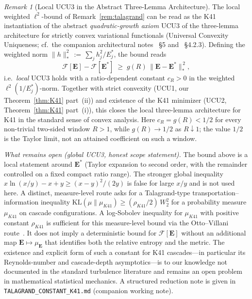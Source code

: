 \documentclass[12pt,a4paper]{article}
\theoremstyle{definition}
\theoremstyle{plain}
\theoremstyle{remark}
\newtheorem{remark}[definition]{Remark}
\begin{document}
\begin{remark}[Local UCU3 in the Abstract Three-Lemma Architecture]
\label{rem:local-ucu3}
The local weighted $\ell^2$-bound of Remark~\ref{rem:talagrand} can be read as
the K41 instantiation of the abstract \emph{quadratic-growth axiom}
\textnormal{UCU3} of the three-lemma architecture for strictly convex
variational functionals (Universal Convexity Uniqueness; cf.\ the
companion architectural notes ~\S5
and ~\S4.2.3).  Defining the
weighted norm $\|h\|^2_*\,:=\,\sum_j h_j^2/E_j^*$, the bound reads
\[
  \mathcal{F}[\mathbf{E}] - \mathcal{F}[\mathbf{E}^*]
  \;\ge\;
  g(R)\,\|\mathbf{E}-\mathbf{E}^*\|_*^{\,2},
\]
i.e.\ \emph{local} UCU3 holds with a ratio-dependent constant $c_R>0$ in
the weighted $\ell^2(1/E_j^*)$-norm.  Together with strict convexity (UCU1, our
Theorem~\ref{thm:K41} part~(ii)) and existence of the K41 minimizer
(UCU2, Theorem~\ref{thm:K41} part~(i)), this closes the local
three-lemma architecture for K41 in the standard sense of convex
analysis.  Here $c_R=g(R)<1/2$ for every non-trivial two-sided window
$R>1$, while $g(R)\to1/2$ as $R\downarrow1$; the value $1/2$ is the
Taylor limit, not an attained coefficient on such a window.

\smallskip\noindent\textit{What remains open (global UCU3, honest scope
statement).} The bound above is a local statement around $\mathbf{E}^*$
(Taylor expansion to second order, with the remainder controlled on a
fixed compact ratio range).  The stronger global inequality
$x\ln(x/y)-x+y\ge (x-y)^2/(2y)$ is false for large $x/y$ and is not used
here.  A distinct, measure-level route asks for a
Talagrand-type transportation--information inequality
$\mathrm{KL}(\mu\|\mu_{K41}) \ge (\rho_{K41}/2)\,W_2^2$ for a probability
measure $\mu_{K41}$ on cascade configurations.  A log-Sobolev inequality
for $\mu_{K41}$ with positive constant $\rho_{K41}$ is sufficient for
this measure-level bound via the Otto--Villani
route~\cite{OttoVillani2000}.  It does not imply a deterministic bound for
$\mathcal F[\mathbf E]$ without an additional map
$\mathbf E\mapsto\mu_{\mathbf E}$ that identifies both the relative
entropy and the metric.  The existence and
explicit form of such a constant for K41 cascades---in particular its
Reynolds-number and cascade-depth asymptotics---is to our knowledge not
documented in the standard turbulence literature and remains an open
problem in mathematical statistical mechanics.  A structured reduction
note is given in \texttt{TALAGRAND\_CONSTANT\_K41.md} (companion
working note).
\end{remark}
\end{document}
